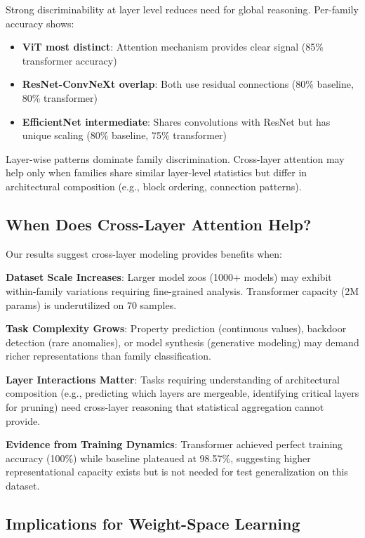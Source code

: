Strong discriminability at layer level reduces need for global reasoning. Per-family accuracy shows:

\begin{itemize}
\item \textbf{ViT most distinct}: Attention mechanism provides clear signal (85\% transformer accuracy)
\item \textbf{ResNet-ConvNeXt overlap}: Both use residual connections (80\% baseline, 80\% transformer)
\item \textbf{EfficientNet intermediate}: Shares convolutions with ResNet but has unique scaling (80\% baseline, 75\% transformer)
\end{itemize}

Layer-wise patterns dominate family discrimination. Cross-layer attention may help only when families share similar layer-level statistics but differ in architectural composition (e.g., block ordering, connection patterns).

\subsection{When Does Cross-Layer Attention Help?}

Our results suggest cross-layer modeling provides benefits when:

\textbf{Dataset Scale Increases}: Larger model zoos (1000+ models) may exhibit within-family variations requiring fine-grained analysis. Transformer capacity (2M params) is underutilized on 70 samples.

\textbf{Task Complexity Grows}: Property prediction (continuous values), backdoor detection (rare anomalies), or model synthesis (generative modeling) may demand richer representations than family classification.

\textbf{Layer Interactions Matter}: Tasks requiring understanding of architectural composition (e.g., predicting which layers are mergeable, identifying critical layers for pruning) need cross-layer reasoning that statistical aggregation cannot provide.

\textbf{Evidence from Training Dynamics}: Transformer achieved perfect training accuracy (100\%) while baseline plateaued at 98.57\%, suggesting higher representational capacity exists but is not needed for test generalization on this dataset.

\subsection{Implications for Weight-Space Learning}

